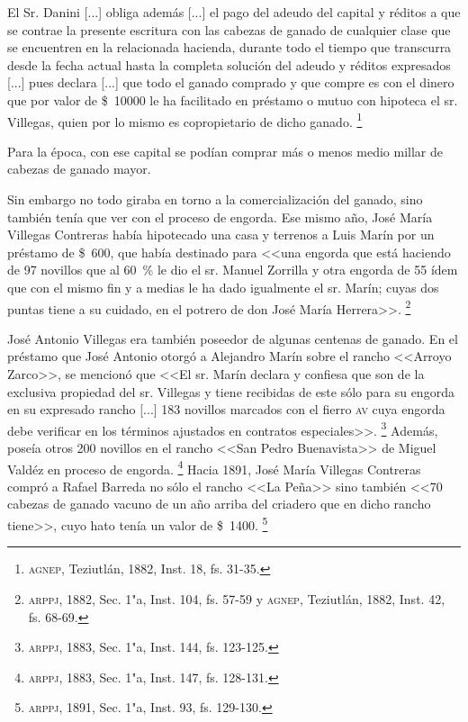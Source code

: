 \documentclass[14pt,twoside,final]{extbook} %
\let\oldfootnote\footnote
\renewcommand\footnote[1]{%
\oldfootnote{\hspace{1mm}#1}}
\begin{document}
\begin{quoting}
El Sr. Danini [...] obliga además [...] el pago del adeudo del capital y réditos a que se contrae la presente escritura con las cabezas de ganado de cualquier clase que se encuentren en la relacionada hacienda, durante todo el tiempo que transcurra desde la fecha actual hasta la completa solución del adeudo y réditos expresados [...] pues declara [...] que todo el ganado comprado y que compre es con el dinero que por valor de \$~10000 le ha facilitado en préstamo o mutuo con hipoteca el sr. Villegas, quien por lo mismo es copropietario de dicho ganado.\footnote{\textsc{agnep}, Teziutlán, 1882, Inst. 18, fs. 31-35.}
\end{quoting}
Para la época, con ese capital se podían comprar más o menos medio millar de cabezas de ganado mayor.

Sin embargo no todo giraba en torno a la comercialización del ganado, sino también tenía que ver con el proceso de engorda. Ese mismo año, José María Villegas Contreras había hipotecado una casa y terrenos a Luis Marín por un préstamo de \$~600, que había destinado para <<una engorda que está haciendo de 97 novillos que al 60~\% le dio el sr. Manuel Zorrilla y otra engorda de 55 ídem que con el mismo fin y a medias le ha dado igualmente el sr. Marín; cuyas dos puntas tiene a su cuidado, en el potrero de don José María Herrera>>.\footnote{\textsc{arppj}, 1882, Sec. 1"a, Inst. 104, fs. 57-59 y \textsc{agnep}, Teziutlán, 1882, Inst. 42, fs. 68-69.}

José Antonio Villegas era también poseedor de algunas centenas de ganado. En el préstamo que José Antonio otorgó a Alejandro Marín sobre el rancho <<Arroyo Zarco>>, se mencionó que <<El sr. Marín declara y confiesa que son de la exclusiva propiedad del sr. Villegas y tiene recibidas de este sólo para su engorda en su expresado rancho [...] 183 novillos marcados con el fierro \textsc{av} cuya engorda debe verificar en los términos ajustados en contratos especiales>>.\footnote{\textsc{arppj}, 1883, Sec. 1"a, Inst. 144, fs. 123-125.} Además, poseía otros 200 novillos en el rancho <<San Pedro Buenavista>> de Miguel Valdéz en proceso de engorda.\footnote{\textsc{arppj}, 1883, Sec. 1"a, Inst. 147, fs. 128-131.} Hacia 1891, José María Villegas Contreras compró a Rafael Barreda no sólo el rancho <<La Peña>> sino también <<70 cabezas de ganado vacuno de un año arriba del criadero que en dicho rancho tiene>>, cuyo hato tenía un valor de \$~1400.\footnote{\textsc{arppj}, 1891, Sec. 1"a, Inst. 93, fs. 129-130.}
\end{document}
